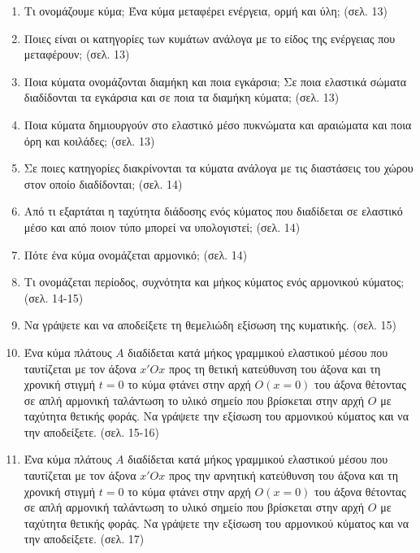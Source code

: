 \documentclass{article}
\begin{document}
\begin{enumerate}
      \item Τι ονομάζουμε κύμα; Ένα κύμα μεταφέρει ενέργεια, ορμή και ύλη; (σελ. 13)

      \item Ποιες είναι οι κατηγορίες των κυμάτων ανάλογα με το είδος της ενέργειας που μεταφέρουν; (σελ. 13)

      \item Ποια κύματα ονομάζονται διαμήκη και ποια εγκάρσια; Σε ποια ελαστικά σώματα διαδίδονται τα εγκάρσια και σε ποια τα διαμήκη κύματα; (σελ. 13)

      \item Ποια κύματα δημιουργούν στο ελαστικό μέσο πυκνώματα και αραιώματα και ποια όρη και κοιλάδες; (σελ. 13)

      \item Σε ποιες κατηγορίες διακρίνονται τα κύματα ανάλογα με τις διαστάσεις του χώρου στον οποίο διαδίδονται; (σελ. 14)

      \item Από τι εξαρτάται η ταχύτητα διάδοσης ενός κύματος που διαδίδεται σε ελαστικό μέσο και από ποιον τύπο μπορεί να υπολογιστεί; (σελ. 14)

      \item Πότε ένα κύμα ονομάζεται αρμονικό; (σελ. 14)

      \item Τι ονομάζεται περίοδος, συχνότητα και μήκος κύματος ενός αρμονικού κύματος; (σελ. 14-15)

      \item Να γράψετε και να αποδείξετε τη θεμελιώδη εξίσωση της κυματικής. (σελ. 15)

      \item Ένα κύμα πλάτους $A$ διαδίδεται κατά μήκος γραμμικού ελαστικού μέσου που ταυτίζεται με τον άξονα $x'Ox$ προς τη θετική κατεύθυνση του άξονα και τη χρονική στιγμή $t = 0$ το κύμα φτάνει στην αρχή $O(x = 0)$ του άξονα θέτοντας σε απλή αρμονική ταλάντωση το υλικό σημείο που βρίσκεται στην αρχή $O$ με ταχύτητα θετικής φοράς. Να γράψετε την εξίσωση του αρμονικού κύματος και να την αποδείξετε. (σελ. 15-16)

      \item Ένα κύμα πλάτους $A$ διαδίδεται κατά μήκος γραμμικού ελαστικού μέσου που ταυτίζεται με τον άξονα $x'Ox$ προς την αρνητική κατεύθυνση του άξονα και τη χρονική στιγμή $t = 0$ το κύμα φτάνει στην αρχή $O(x = 0)$ του άξονα θέτοντας σε απλή αρμονική ταλάντωση το υλικό σημείο που βρίσκεται στην αρχή $O$ με ταχύτητα θετικής φοράς. Να γράψετε την εξίσωση του αρμονικού κύματος και να την αποδείξετε. (σελ. 17)


\end{enumerate}
\end{document}
